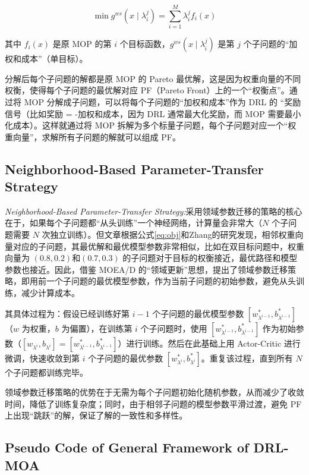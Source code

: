 \documentclass[fontset=none]{ctexart}
\begin{document}
\begin{equation}
    \min g^{ws}(x\mid \lambda^j_i) = \sum_{i=1}^{M} \lambda^j_i f_i(x)\label{eq:obj}
\end{equation}

其中 $f_i(x)$ 是原 MOP 的第 $i$ 个目标函数，$g^{ws}(x\mid \lambda^j_i)$ 是第 $j$ 个子问题的“加权和成本”（单目标）。 

分解后每个子问题的解都是原 MOP 的 Pareto 最优解，这是因为权重向量的不同权衡，使得每个子问题的最优解对应 PF（Pareto Front）上的一个“权衡点”。通过将 MOP 分解成子问题，可以将每个子问题的“加权和成本”作为 DRL 的 “奖励信号（比如奖励 = -加权和成本，因为 DRL 通常最大化奖励，而 MOP 需要最小化成本）。这样就通过将 MOP 拆解为多个标量子问题，每个子问题对应一个“权重向量”，求解所有子问题的解就可以组成 PF。

\subsection{Neighborhood-Based Parameter-Transfer Strategy}

\textit{Neighborhood-Based Parameter-Transfer Strategy:}采用领域参数迁移的策略的核心在于，如果每个子问题都“从头训练”一个神经网络，计算量会非常大（$N$ 个子问题需要 $N$ 次独立训练）。但文章根据公式\cref{eq:obj}和Zhang的研究\cite{zhangMOEAMultiobjectiveEvolutionary2007}发现，相邻权重向量对应的子问题，其最优解和最优模型参数非常相似，比如在双目标问题中，权重向量为 $(0.8,0.2)$和$(0.7,0.3)$ 的子问题对于目标的权衡接近，最优路径和模型参数也接近。因此，借鉴 MOEA/D 的“领域更新”思想\cite{zhangMOEAMultiobjectiveEvolutionary2007}，提出了领域参数迁移策略，即用前一个子问题的最优模型参数，作为当前子问题的初始参数，避免从头训练，减少计算成本。

其具体过程为：假设已经训练好第 $i - 1$ 个子问题的最优模型参数 $[w_{\lambda^{i-1}}^*, b_{\lambda^{i-1}}^*]$（$w$ 为权重，$b$ 为偏置），在训练第 $i$ 个子问题时，使用 $[w_{\lambda^{i-1}}^*, b_{\lambda^{i-1}}^*]$ 作为初始参数（$[w_{\lambda^i}, b_{\lambda^i}] = [w_{\lambda^{i-1}}^*, b_{\lambda^{i-1}}^*]$）进行训练。然后在此基础上用 Actor-Critic 进行微调，快速收敛到第 $i$ 个子问题的最优参数 $[w_{\lambda^i}^*, b_{\lambda^i}^*]$。重复该过程，直到所有 $N$ 个子问题都训练完毕。

领域参数迁移策略的优势在于无需为每个子问题初始化随机参数，从而减少了收敛时间，降低了训练复杂度；同时，由于相邻子问题的模型参数平滑过渡，避免 PF 上出现“跳跃”的解，保证了解的一致性和多样性。

\subsection{Pseudo Code of General Framework of DRL-MOA}
\end{document}

